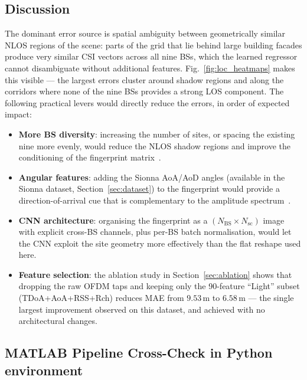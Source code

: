 \subsection{Discussion}

The dominant error source is spatial ambiguity between geometrically
similar NLOS regions of the scene: parts of the grid that lie behind
large building facades produce very similar CSI vectors across all nine
BSs, which the learned regressor cannot disambiguate without additional
features.
Fig.~\ref{fig:loc_heatmaps} makes this visible --- the largest errors
cluster around shadow regions and along the corridors where none of the
nine BSs provides a strong LOS component.
The following practical levers would directly reduce the errors, in
order of expected impact:
\begin{itemize}
  \item \textbf{More BS diversity}: increasing the number of sites, or
        spacing the existing nine more evenly, would reduce the NLOS
        shadow regions and improve the conditioning of the fingerprint
        matrix~\cite{3gpp_nr_channel}.
  \item \textbf{Angular features}: adding the Sionna AoA/AoD angles
        (available in the Sionna dataset, Section~\ref{sec:dataset}) to the fingerprint would provide
        a direction-of-arrival cue that is complementary to the amplitude
        spectrum~\cite{hoydis2023sionna_rt}.
  \item \textbf{CNN architecture}: organising the fingerprint as a
        $(N_{\mathrm{BS}}\times N_{\mathrm{sc}})$ image with explicit
        cross-BS channels, plus per-BS batch normalisation, would let the
        CNN exploit the site geometry more effectively than the flat
        reshape used here.
  \item \textbf{Feature selection}: the ablation study in
        Section~\ref{sec:ablation} shows that dropping the raw OFDM taps
        and keeping only the 90-feature
        ``Light'' subset (TDoA+AoA+RSS+Rch) reduces MAE from
        $9.53\,\text{m}$ to $6.58\,\text{m}$ --- the single largest
        improvement observed on this dataset, and achieved with no
        architectural changes.
\end{itemize}



\subsection{MATLAB Pipeline Cross-Check in Python environment}
\label{sec:matlab_localization}

